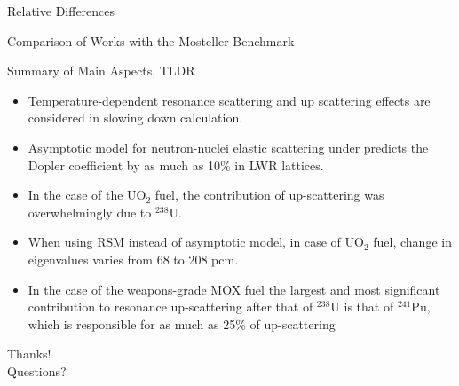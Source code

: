 \documentclass[sans,mathserif,aspectratio=169]{beamer}
\begin{document}
\begin{frame}{Relative Differences}
\centering
{}
\end{frame}

\begin{frame}{Comparison of Works with the Mosteller Benchmark}
\centering
{}
\end{frame}

\begin{frame}{Summary of Main Aspects, TLDR}
\begin{itemize}
\item Temperature-dependent resonance scattering and up scattering effects are considered in slowing down calculation. \pause
\item Asymptotic model for neutron-nuclei elastic scattering under predicts the Dopler coefficient by as much as 10\% in LWR lattices. \pause
\item In the case of the UO$_2$ fuel, the contribution of up-scattering was overwhelmingly due to $^{238}$U. \pause
\item When using RSM instead of asymptotic model, in case of UO$_2$ fuel, change in eigenvalues varies from 68 to 208 pcm.\pause
\item In the case of the weapons-grade MOX fuel the largest and most significant contribution to resonance up-scattering after that of $^{238}$U is that of $^{241}$Pu, which is responsible for as much as 25\% of up-scattering
\end{itemize}
\end{frame}

\begin{frame}
\centering
\Huge
Thanks! \\
Questions?
\end{frame}
\end{document}
